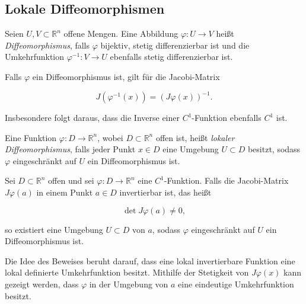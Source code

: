 \subsection{Lokale Diffeomorphismen}

\begin{definition}{}
Seien \( U, V \subset \mathbb{R}^n \) offene Mengen. Eine Abbildung \( \varphi: U \to V \) heißt \emph{Diffeomorphismus}, falls \( \varphi \) bijektiv, stetig differenzierbar ist und die Umkehrfunktion \( \varphi^{-1}: V \to U \) ebenfalls stetig differenzierbar ist.
\end{definition}

\begin{bemerkungbox}
Falls \( \varphi \) ein Diffeomorphismus ist, gilt für die Jacobi-Matrix


\[
J(\varphi^{-1}(x)) = (J\varphi(x))^{-1}.
\]


Insbesondere folgt daraus, dass die Inverse einer \( C^1 \)-Funktion ebenfalls \( C^1 \) ist.
\end{bemerkungbox}

\begin{definition}{}
Eine Funktion \( \varphi: D \to \mathbb{R}^n \), wobei \( D \subset \mathbb{R}^n \) offen ist, heißt \emph{lokaler Diffeomorphismus}, falls jeder Punkt \( x \in D \) eine Umgebung \( U \subset D \) besitzt, sodass \( \varphi \) eingeschränkt auf \( U \) ein Diffeomorphismus ist.
\end{definition}

\begin{satz}{}
Sei \( D \subset \mathbb{R}^n \) offen und sei \( \varphi: D \to \mathbb{R}^n \) eine \( C^1 \)-Funktion. Falls die Jacobi-Matrix \( J\varphi(a) \) in einem Punkt \( a \in D \) invertierbar ist, das heißt


\[
\det J\varphi(a) \neq 0,
\]


so existiert eine Umgebung \( U \subset D \) von \( a \), sodass \( \varphi \) eingeschränkt auf \( U \) ein Diffeomorphismus ist.
\end{satz}

\begin{beweisbox}
Die Idee des Beweises beruht darauf, dass eine lokal invertierbare Funktion eine lokal definierte Umkehrfunktion besitzt. Mithilfe der Stetigkeit von \( J\varphi(x) \) kann gezeigt werden, dass \( \varphi \) in der Umgebung von \( a \) eine eindeutige Umkehrfunktion besitzt.
\end{beweisbox}



